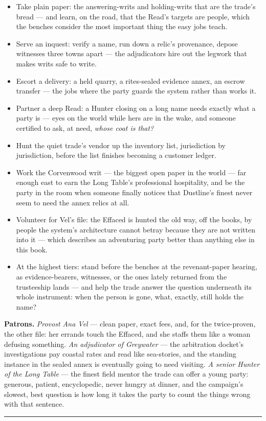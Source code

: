 \begin{itemize}
    \item Take plain paper: the answering-writs and holding-writs that are the trade's bread --- and learn, on the road, that the Read's targets are people, which the benches consider the most important thing the easy jobs teach.
    \item Serve an inquest: verify a name, run down a relic's provenance, depose witnesses three towns apart --- the adjudicators hire out the legwork that makes writs safe to write.
    \item Escort a delivery: a held quarry, a rites-sealed evidence annex, an escrow transfer --- the jobs where the party guards the system rather than works it.
    \item Partner a deep Read: a Hunter closing on a long name needs exactly what a party is --- eyes on the world while hers are in the wake, and someone certified to ask, at need, \textit{whose coat is that?}
    \item Hunt the quiet trade's vendor up the inventory list, jurisdiction by jurisdiction, before the list finishes becoming a customer ledger.
    \item Work the Corvenwood writ --- the biggest open paper in the world --- far enough east to earn the Long Table's professional hospitality, and be the party in the room when someone finally notices that Dustline's finest never seem to need the annex relics at all.
    \item Volunteer for Vel's file: the Effaced is hunted the old way, off the books, by people the system's architecture cannot betray because they are not written into it --- which describes an adventuring party better than anything else in this book.
    \item At the highest tiers: stand before the benches at the revenant-paper hearing, as evidence-bearers, witnesses, or the ones lately returned from the trusteeship lands --- and help the trade answer the question underneath its whole instrument: when the person is gone, what, exactly, still holds the name?
\end{itemize}

\textbf{Patrons.} \textit{Provost Ana Vel} --- clean paper, exact fees, and, for the twice-proven, the other file: her errands touch the Effaced, and she staffs them like a woman defusing something. \textit{An adjudicator of Greywater} --- the arbitration docket's investigations pay coastal rates and read like sea-stories, and the standing instance in the sealed annex is eventually going to need visiting. \textit{A senior Hunter of the Long Table} --- the finest field mentor the trade can offer a young party: generous, patient, encyclopedic, never hungry at dinner, and the campaign's slowest, best question is how long it takes the party to count the things wrong with that sentence.

\medskip\hrule\medskip
